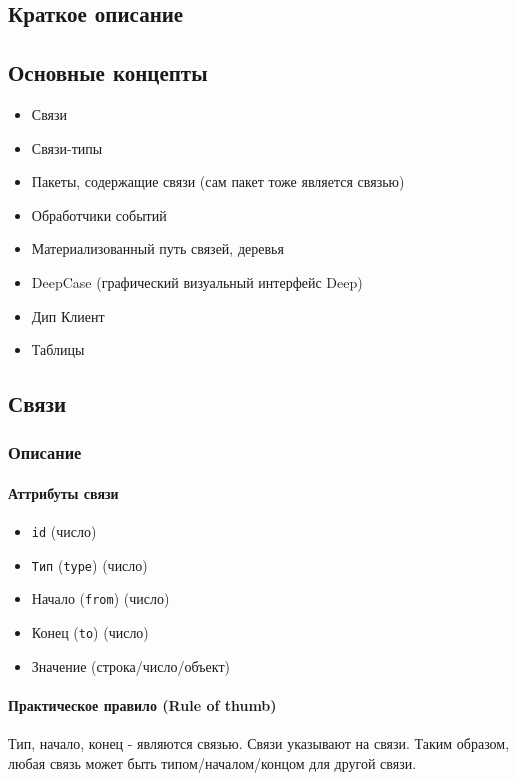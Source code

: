 \documentclass{article}
\begin{document}
\subsection{Краткое описание}

\subsection{Основные концепты}

\begin{itemize}
  \item Связи
  \item Связи-типы
  \item Пакеты, содержащие связи (сам пакет тоже является связью)
  \item Обработчики событий
  \item Материализованный путь связей, деревья
  \item DeepCase (графический визуальный интерфейс Deep)
  \item Дип Клиент
  \item Таблицы
\end{itemize}

\subsection{Связи}

\subsubsection{Описание}

\paragraph{Аттрибуты связи}

\begin{itemize}
  \item \texttt{id} (число)
  \item \texttt{Тип} (\texttt{type}) (число)
  \item Начало (\texttt{from}) (число)
  \item Конец (\texttt{to}) (число)
  \item Значение (строка/число/объект)
\end{itemize}

\paragraph{Практическое правило (Rule of thumb)}
Тип, начало, конец - являются связью. Связи указывают на связи. Таким образом,
любая связь может быть типом/началом/концом для другой связи.
\end{document}
